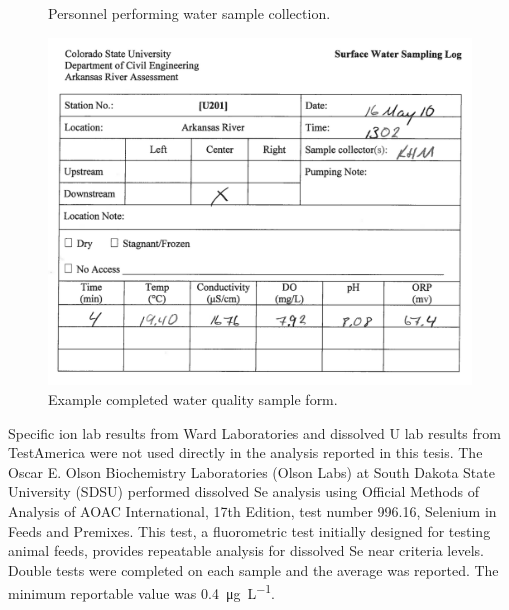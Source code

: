 \begin{figure}[htbp]
\centering
	\hspace{4em}%
	\caption[Personnel performing water sample collection.]{Personnel performing water sample collection.}
	\label{pic:sampling}
\end{figure}

\begin{figure}[htbp]
	\centering
	\includegraphics[width=6in]{Figures/SampleLogFilled}
	\caption[Example completed water quality sample form.]{Example completed water quality sample form.}
	\label{fig:samplogComplete}
\end{figure}

Specific ion lab results from Ward Laboratories and dissolved U lab results from TestAmerica were not used directly in the analysis reported in this tesis.  The Oscar E. Olson Biochemistry Laboratories (Olson Labs) at South Dakota State University (SDSU) performed dissolved Se analysis using Official Methods of Analysis of AOAC International, 17th Edition, test number 996.16, Selenium in Feeds and Premixes.  This test, a fluorometric test initially designed for testing animal feeds, provides repeatable analysis for dissolved Se near criteria levels.  Double tests were completed on each sample and the average was reported.  The minimum reportable value was \SI{0.4}{\micro\gram\per\liter}.  

